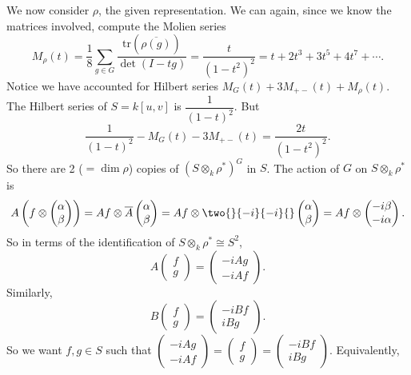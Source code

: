 \begin{ex}
We now consider $\rho$, the given representation. We can again, since we know the matrices involved, compute the Molien series 
	\[
	M_\rho(t)= \dfrac{1}{8} \sum_{g \in G} \dfrac{\text{tr}(\overline{\rho(g)})}{\det(I-tg)}= \dfrac{t}{(1-t^2)^2}= t+ 2t^3 + 3t^5 + 4t^7 + \cdots.
	\]
Notice we have accounted for Hilbert series $M_G(t)+ 3M_{+-}(t) + M_\rho(t)$. The Hilbert series of $S= k[u,v]$ is $\dfrac{1}{(1-t)^2}$. But
	\[
	\dfrac{1}{(1-t)^2} - M_G(t) - 3 M_{+-}(t)= \dfrac{2t}{(1-t^2)^2}.
	\]
So there are 2 ($=\dim \rho$) copies of $(S \otimes_k \rho^*)^G$ in $S$. The action of $G$ on $S \otimes_k \rho^*$ is 
	\[
	A \left( f \otimes \begin{pmatrix} \alpha \\ \beta \end{pmatrix} \right)= Af \otimes \overline{A} \begin{pmatrix} \alpha \\ \beta \end{pmatrix}= Af \otimes \two{}{-i}{-i}{} \begin{pmatrix} \alpha \\ \beta \end{pmatrix} = Af \otimes \begin{pmatrix} -i \beta \\ -i\alpha \end{pmatrix}.
	\]
So in terms of the identification of $S \otimes_k \rho^* \cong S^2$,
	\[
	A \begin{pmatrix} f \\ g \end{pmatrix}= \begin{pmatrix} -iAg \\ -iAf \end{pmatrix}.
	\]
Similarly, 
	\[
	B \begin{pmatrix} f \\ g \end{pmatrix}= \begin{pmatrix} -iBf \\ iBg \end{pmatrix}.
	\]
So we want $f,g \in S$ such that $\begin{pmatrix} -iAg \\ -iAf \end{pmatrix}= \begin{pmatrix} f \\ g \end{pmatrix}= \begin{pmatrix} -iBf \\ iBg \end{pmatrix}$. Equivalently,

\end{ex}
